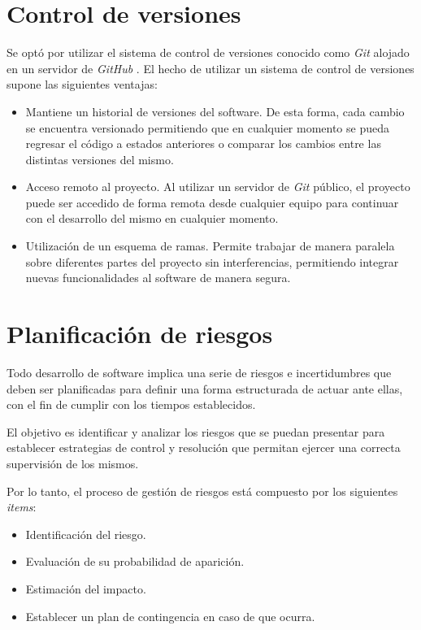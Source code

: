 \section{Control de versiones}
Se optó por utilizar el sistema de control de versiones conocido como \textit{Git} \parencite{gitref} alojado en un servidor de \textit{GitHub} \parencite{githubref}. El hecho de utilizar un sistema de control de versiones supone las siguientes ventajas:

\begin{itemize}
	\item Mantiene un historial de versiones del software. De esta forma, cada cambio se encuentra versionado permitiendo que en cualquier momento se pueda regresar el código a estados anteriores o comparar los cambios entre las distintas versiones del mismo.   
	\item Acceso remoto al proyecto. Al utilizar un servidor de \textit{Git} público, el proyecto puede ser accedido de forma remota desde cualquier equipo para continuar con el desarrollo del mismo en cualquier momento.
	\item Utilización de un esquema de ramas. Permite trabajar de manera paralela sobre diferentes partes del proyecto sin interferencias, permitiendo integrar nuevas funcionalidades al software de manera segura.
\end{itemize}

\section{Planificación de riesgos}
Todo desarrollo de software implica una serie de riesgos e incertidumbres que deben ser planificadas para definir una forma estructurada de actuar ante ellas, con el fin de cumplir con los tiempos establecidos.

El objetivo es identificar y analizar los riesgos que se puedan presentar para establecer estrategias de control y resolución que permitan ejercer una correcta supervisión de los mismos.

Por lo tanto, el proceso de gestión de riesgos está compuesto por los siguientes \textit{items}:

\begin{itemize}
	\item Identificación del riesgo.
  \item Evaluación de su probabilidad de aparición.
  \item Estimación del impacto.
  \item Establecer un plan de contingencia en caso de que ocurra.
\end{itemize}

